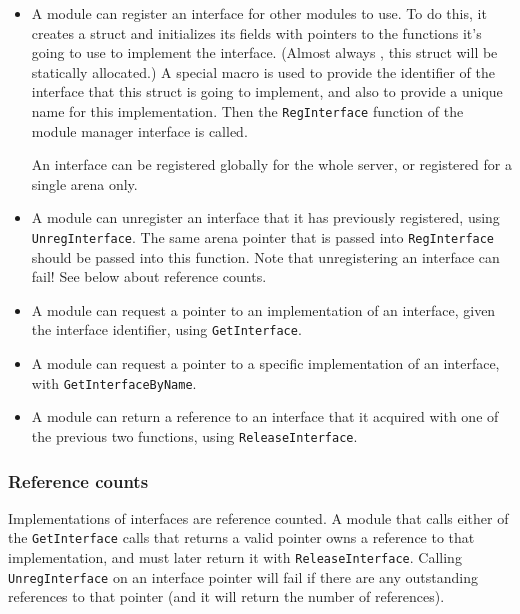 \documentclass{article}
\begin{document}
\begin{itemize}

\item A module can register an interface for other modules to use. To do
this, it creates a struct and initializes its fields with pointers to
the functions it's going to use to implement the interface. (Almost
always , this struct will be statically allocated.) A special macro is
used to provide the identifier of the interface that this struct is
going to implement, and also to provide a unique name for this
implementation. Then the \verb/RegInterface/ function of the module
manager interface is called.

An interface can be registered globally for the whole server, or
registered for a single arena only.

\item A module can unregister an interface that it has previously
registered, using \verb/UnregInterface/. The same arena pointer that is
passed into \verb/RegInterface/ should be passed into this function.
Note that unregistering an interface can fail! See below about reference
counts.

\item A module can request a pointer to an implementation of an
interface, given the interface identifier, using \verb/GetInterface/.

\item A module can request a pointer to a specific implementation of an
interface, with \verb/GetInterfaceByName/.

\item A module can return a reference to an interface that it acquired
with one of the previous two functions, using \verb/ReleaseInterface/.

\end{itemize}

\subsubsection{Reference counts}

Implementations of interfaces are reference counted. A module that calls
either of the \verb/GetInterface/ calls that returns a valid pointer
owns a reference to that implementation, and must later return it with
\verb/ReleaseInterface/. Calling \verb/UnregInterface/ on an interface
pointer will fail if there are any outstanding references to that
pointer (and it will return the number of references).
\end{document}

